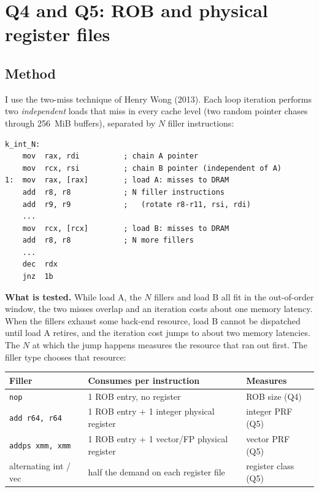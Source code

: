 \documentclass[11pt]{article}
\newcommand{\file}[1]{\texttt{\detokenize{#1}}}
\begin{document}
\section{Q4 and Q5: ROB and physical register files}
\label{sec:rob}

\subsection{Method}

I use the two-miss technique of Henry Wong (2013). Each loop iteration
performs two \emph{independent} loads that miss in every cache level (two
random pointer chases through 256~MiB buffers), separated by $N$ filler
instructions:

\begin{lstlisting}[language={[x86masm]Assembler},caption={Generated kernel for the integer filler (annotated excerpt of \file{build/rob_prf_kernels.S}, produced by \file{exp/rob_prf/gen_kernels.py}).}]
k_int_N:
    mov  rax, rdi          ; chain A pointer
    mov  rcx, rsi          ; chain B pointer (independent of A)
1:  mov  rax, [rax]        ; load A: misses to DRAM
    add  r8, r8            ; N filler instructions
    add  r9, r9            ;   (rotate r8-r11, rsi, rdi)
    ...
    mov  rcx, [rcx]        ; load B: misses to DRAM
    add  r8, r8            ; N more fillers
    ...
    dec  rdx
    jnz  1b
\end{lstlisting}

\textbf{What is tested.} While load A, the $N$ fillers and load B all fit in
the out-of-order window, the two misses overlap and an iteration costs about
one memory latency. When the fillers exhaust some back-end resource, load B
cannot be dispatched until load A retires, and the iteration cost jumps to
about two memory latencies. The $N$ at which the jump happens measures the
resource that ran out first. The filler type chooses that resource:

\begin{center}
\small
\begin{tabular}{lll}
\toprule
Filler & Consumes per instruction & Measures \\
\midrule
\texttt{nop} & 1 ROB entry, no register & ROB size (Q4) \\
\texttt{add r64, r64} & 1 ROB entry + 1 integer physical register & integer PRF (Q5) \\
\texttt{addps xmm, xmm} & 1 ROB entry + 1 vector/FP physical register & vector PRF (Q5) \\
alternating int / vec & half the demand on each register file & register class (Q5) \\
\bottomrule
\end{tabular}
\end{center}
\end{document}
